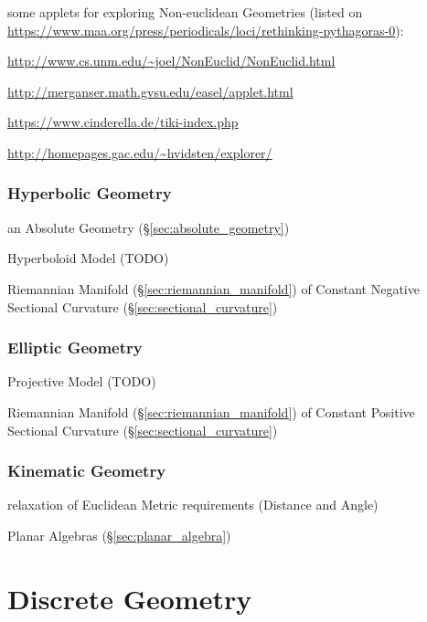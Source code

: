 some applets for exploring Non-euclidean Geometries (listed on
\url{https://www.maa.org/press/periodicals/loci/rethinking-pythagoras-0}):

\url{http://www.cs.unm.edu/~joel/NonEuclid/NonEuclid.html}

\url{http://merganser.math.gvsu.edu/easel/applet.html}

\url{https://www.cinderella.de/tiki-index.php}

\url{http://homepages.gac.edu/~hvidsten/explorer/}



\subsubsection{Hyperbolic Geometry}\label{sec:hyperbolic_geometry}

an Absolute Geometry (\S\ref{sec:absolute_geometry})

Hyperboloid Model (TODO)


Riemannian Manifold (\S\ref{sec:riemannian_manifold}) of Constant Negative
Sectional Curvature (\S\ref{sec:sectional_curvature})



\subsubsection{Elliptic Geometry}\label{sec:elliptic_geometry}

Projective Model (TODO)

Riemannian Manifold (\S\ref{sec:riemannian_manifold}) of Constant Positive
Sectional Curvature (\S\ref{sec:sectional_curvature})



\subsubsection{Kinematic Geometry}\label{sec:kinematic_geometry}\hfill

relaxation of Euclidean Metric requirements (Distance and Angle)

Planar Algebras (\S\ref{sec:planar_algebra})




\section{Discrete Geometry}\label{sec:discrete_geometry}

